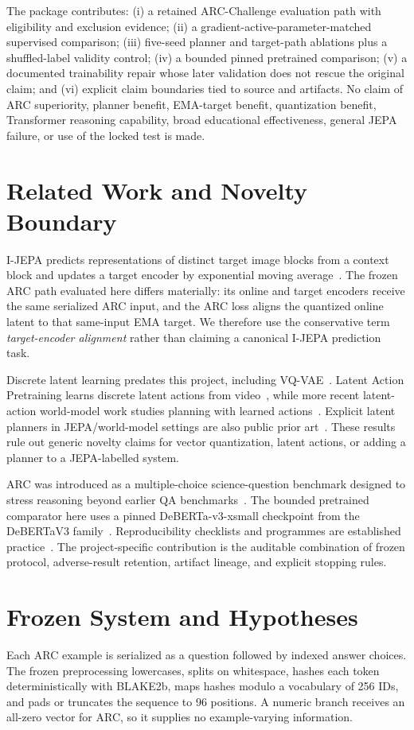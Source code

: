 \documentclass[conference]{IEEEtran}
\begin{document}
The package contributes: (i) a retained ARC-Challenge evaluation path with eligibility and exclusion evidence; (ii) a gradient-active-parameter-matched supervised comparison; (iii) five-seed planner and target-path ablations plus a shuffled-label validity control; (iv) a bounded pinned pretrained comparison; (v) a documented trainability repair whose later validation does not rescue the original claim; and (vi) explicit claim boundaries tied to source and artifacts. No claim of ARC superiority, planner benefit, EMA-target benefit, quantization benefit, Transformer reasoning capability, broad educational effectiveness, general JEPA failure, or use of the locked test is made.

\section{Related Work and Novelty Boundary}
I-JEPA predicts representations of distinct target image blocks from a context block and updates a target encoder by exponential moving average~\cite{ijepa}. The frozen ARC path evaluated here differs materially: its online and target encoders receive the same serialized ARC input, and the ARC loss aligns the quantized online latent to that same-input EMA target. We therefore use the conservative term \emph{target-encoder alignment} rather than claiming a canonical I-JEPA prediction task.

Discrete latent learning predates this project, including VQ-VAE~\cite{vqvae}. Latent Action Pretraining learns discrete latent actions from video~\cite{lapa}, while more recent latent-action world-model work studies planning with learned actions~\cite{lawms}. Explicit latent planners in JEPA/world-model settings are also public prior art~\cite{ffjepa}. These results rule out generic novelty claims for vector quantization, latent actions, or adding a planner to a JEPA-labelled system.

ARC was introduced as a multiple-choice science-question benchmark designed to stress reasoning beyond earlier QA benchmarks~\cite{arc}. The bounded pretrained comparator here uses a pinned DeBERTa-v3-xsmall checkpoint from the DeBERTaV3 family~\cite{debertav3}. Reproducibility checklists and programmes are established practice~\cite{repro}. The project-specific contribution is the auditable combination of frozen protocol, adverse-result retention, artifact lineage, and explicit stopping rules.

\section{Frozen System and Hypotheses}
Each ARC example is serialized as a question followed by indexed answer choices. The frozen preprocessing lowercases, splits on whitespace, hashes each token deterministically with BLAKE2b, maps hashes modulo a vocabulary of 256 IDs, and pads or truncates the sequence to 96 positions. A numeric branch receives an all-zero vector for ARC, so it supplies no example-varying information.
\end{document}
